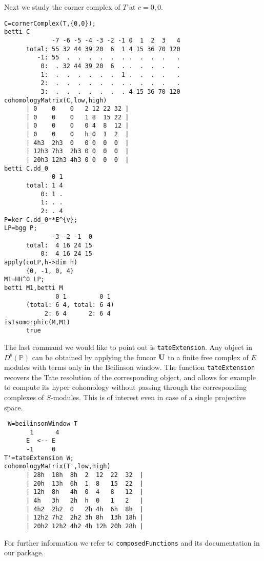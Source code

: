 \documentclass[twoside,12pt, leqno]{amsart}
\def\PP{{\mathbb P}}
\def\bU{{\bf U}}
\begin{document}
\noindent
Next we study the corner complex of $T$ at $c={0,0}$.
{\small \begin{verbatim}
C=cornerComplex(T,{0,0}); 
betti C      
             -7 -6 -5 -4 -3 -2 -1 0  1  2  3   4
      total: 55 32 44 39 20  6  1 4 15 36 70 120
         -1: 55  .  .  .  .  .  . .  .  .  .   .
          0:  . 32 44 39 20  6  . .  .  .  .   .
          1:  .  .  .  .  .  .  1 .  .  .  .   .
          2:  .  .  .  .  .  .  . .  .  .  .   .
          3:  .  .  .  .  .  .  . 4 15 36 70 120
cohomologyMatrix(C,low,high)
      | 0    0    0   2 12 22 32 |
      | 0    0    0   1 8  15 22 |
      | 0    0    0   0 4  8  12 |
      | 0    0    0   h 0  1  2  |
      | 4h3  2h3  0   0 0  0  0  |
      | 12h3 7h3  2h3 0 0  0  0  |
      | 20h3 12h3 4h3 0 0  0  0  |
betti C.dd_0
             0 1
      total: 1 4
          0: 1 .
          1: . .
          2: . 4
P=ker C.dd_0**E^{v};
LP=bgg P;
             -3 -2 -1  0
      total:  4 16 24 15
          0:  4 16 24 15
apply(coLP,h->dim h)
      {0, -1, 0, 4}
M1=HH^0 LP;
betti M1,betti M
              0 1         0 1
      (total: 6 4, total: 6 4)
           2: 6 4      2: 6 4
isIsomorphic(M,M1)
      true
\end{verbatim}}

\noindent
The last command we would like to point out is {\tt tateExtension}. Any object in $D^b(\PP)$ can be obtained by applying the funcor $\bU$ to a finite free complex of $E$ modules with terms only in the Beilinson window. The function {\tt tateExtension} recovers the Tate resolution of the corresponding object,  and allows for example to compute its hyper cohomology without passing through the corresponding complexes of $S$-modules. This is of interest even in case of a single projective space. 
{\small \begin{verbatim}
 W=beilinsonWindow T
       1      4
      E  <-- E              
      -1     0
T'=tateExtension W; 
cohomologyMatrix(T',low,high) 
      | 28h  18h  8h  2  12  22  32  |
      | 20h  13h  6h  1  8   15  22  |
      | 12h  8h   4h  0  4   8   12  |
      | 4h   3h   2h  h  0   1   2   |
      | 4h2  2h2  0   2h 4h  6h  8h  |
      | 12h2 7h2  2h2 3h 8h  13h 18h |
      | 20h2 12h2 4h2 4h 12h 20h 28h |
\end{verbatim}}
\noindent
For further information we refer to  {\tt composedFunctions} and its documentation in our package.
%
%
\end{document}
